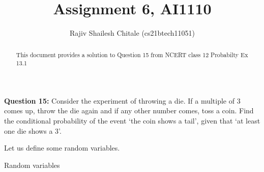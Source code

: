 \documentclass[journal,12pt,twocolumn]{IEEEtran}
\begin{document}
\let\StandardTheFigure\thefigure
\let\vec\mathbf

\def\putbox#1#2#3{\makebox[0in][l]{\makebox[#1][l]{}\raisebox{\baselineskip}[0in][0in]{\raisebox{#2}[0in][0in]{#3}}}}
     \def\rightbox#1{\makebox[0in][r]{#1}}
     \def\centbox#1{\makebox[0in]{#1}}
     \def\topbox#1{\raisebox{-\baselineskip}[0in][0in]{#1}}
     \def\midbox#1{\raisebox{-0.5\baselineskip}[0in][0in]{#1}}
\vspace{3cm}

\title{Assignment 6, AI1110}
\author{Rajiv Shailesh Chitale (cs21btech11051)}	

\maketitle
\begin{abstract}
This document provides a solution to Question 15 from NCERT class 12 Probabilty Ex 13.1
\end{abstract}
\textbf{Question 15:}
Consider the experiment of throwing a die. If a multiple of 3 comes up, throw the die again and if any other number comes, toss a coin. Find the conditional probability of the event \lq the coin shows a tail\rq, given that \lq at least one die shows a 3\rq.

\solution
Let us define some random variables.
\begin{table}[ht!]
    \centering
	
    \caption{Random variables}
    \label{table:RandomVariables}	
\end{table}
\end{document}
